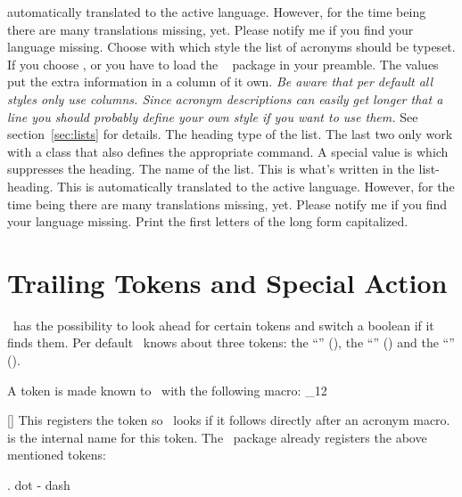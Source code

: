 \documentclass[load-preamble+]{cnltx-doc}
\makeatletter
\renewenvironment{commands}
  {%
    \cnltx@set@catcode_{12}%
    \let\command\cnltx@command
    \cnltxlist
  }
  {\endcnltxlist}
\makeatother
\begin{document}
\begin{options}
    automatically translated to the active language.  However, for the time 
    being there are many translations missing, yet.  Please notify me if you
    find your language missing.
    Choose with which style the list of acronyms should be
    typeset.  If you choose ,  or
     you have to load the
    ~\cite{pkg:longtable} package in your preamble.  The values
     put the extra information in a column of it
    own.  \emph{Be aware that per default \emph{all}  styles
      only use  columns.  Since acronym descriptions can easily get
      longer that a line you should probably define your own style if you want
      to use them.}  See section~\vref{sec:lists} for details.
    The heading type of the list. The last two only work
    with a \KOMAScript{} class that also defines the appropriate command.  A
    special value is  which suppresses the heading.
    The name of the list.  This is what's written in the list-heading.  This
    is automatically translated to the active language.  However, for the time
    being there are many translations missing, yet.  Please notify me if you
    find your language missing.
    Print the first letters of the long form capitalized.
\end{options}

\section{Trailing Tokens and Special Action}

\acro\ has the possibility to look ahead for certain tokens
and switch a boolean if it finds them.  Per default \acro\ knows about three
tokens: the \enquote{} (), the \enquote{}
(\code{-}) and the \enquote{} ().

A token is made known to \acro\ with the following macro:
\begin{commands}
  \command{AcroRegisterTrailing}[]
    This registers the token  so \acro\ looks if it follows
    directly after an acronym macro.   is the internal name for
    this token.
\end{commands}
The \acro\ package already registers the above mentioned tokens:
\begin{sourcecode}
  \AcroRegisterTrailing . {dot}
  \AcroRegisterTrailing - {dash}
  \AcroRegisterTrailing {}
\end{sourcecode}
\end{document}

